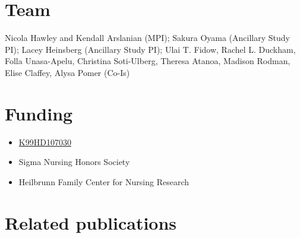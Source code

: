 \documentclass[
  letterpaper,
  DIV=11,
  numbers=noendperiod]{scrreprt}
\providecommand{\tightlist}{%
  \setlength{\itemsep}{0pt}\setlength{\parskip}{0pt}}\usepackage{longtable,booktabs,array}
\begin{document}
\section*{Team}\label{team}


Nicola Hawley and Kendall Arslanian (MPI); Sakura Oyama (Ancillary Study
PI); Lacey Heinsberg (Ancillary Study PI); Ulai T. Fidow, Rachel L.
Duckham, Folla Unasa-Apelu, Christina Soti-Ulberg, Theresa Atanoa,
Madison Rodman, Elise Claffey, Alysa Pomer (Co-Is)

\section*{Funding}\label{funding}


\begin{itemize}
\tightlist
\item
  \href{https://reporter.nih.gov/search/s9cX7Mg6vEiIAQOGIvCqog/project-details/10519784}{K99HD107030}
\item
  Sigma Nursing Honors Society
\item
  Heilbrunn Family Center for Nursing Research
\end{itemize}

\section*{Related publications}\label{related-publications}

\end{document}
